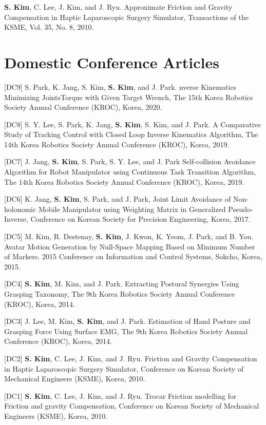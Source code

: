 \documentclass[margin,line]{res}
\begin{document}
\begin{resume}
    [DJ1] \textbf{S. Kim}, C. Lee, J. Kim, and J. Ryu.
  Approximate Friction and Gravity Compensation in Haptic Laparoscopic Surgery Simulator,
  Transactions of the KSME,
  Vol. 35, No. 8, 2010.

  \section{\sc Domestic Conference Articles}
   [DC9] S. Park, K. Jang, S. Kim, \textbf{S. Kim}, and J. Park.
  nverse Kinematics Minimizing JointsTorque with Given Target Wrench,
  The 15th Korea Robotics Society Annual Conference (KROC), Korea, 2020.


    [DC8] S. Y. Lee, S. Park, K. Jang, \textbf{S. Kim}, S. Kim, and J. Park.
  A Comparative Study of Tracking Control with Closed Loop Inverse Kinematics Algorithm,
  The 14th Korea Robotics Society Annual Conference (KROC), Korea, 2019.

    [DC7] J. Jang, \textbf{S. Kim}, S. Park, S. Y. Lee, and J. Park
  Self-collision Avoidance Algorithm for Robot Manipulator using Continuous Task Transition Algorithm,
  The 14th Korea Robotics Society Annual Conference (KROC), Korea, 2019.

    [DC6] K. Jang, \textbf{S. Kim}, S. Park, and J. Park,
  Joint Limit Avoidance of Non-holonomic Mobile Manipulator using Weighting Matrix in Generalized Pseudo-Inverse, Conference on Korean Society for Precision Engineering, Korea, 2017.

    [DC5] M. Kim, R. Destenay, \textbf{S. Kim}, J. Kwon, K. Yeom, {J. Park}, and B. You.
  Avatar Motion Generation by Null-Space Mapping Based on Minimum Number of Markers.
  2015 Conference on Information and Control Systems,
  Sokcho, Korea, 2015.

    [DC4] \textbf{S. Kim}, M. Kim, and J. Park.
  Extracting Postural Synergies Using Grasping Taxonomy,
  The 9th Korea Robotics Society Annual Conference (KROC), Korea, 2014.

    [DC3] J. Lee, M. Kim, \textbf{S. Kim}, and J. Park.
  Estimation of Hand Posture and Grasping Force Using Surface EMG,
  The 9th Korea Robotics Society Annual Conference (KROC), Korea, 2014.

    [DC2] \textbf{S. Kim}, C. Lee, J. Kim, and J. Ryu.
  Friction and Gravity Compensation in Haptic Laparoscopic Surgery Simulator,
  Conference on Korean Society of Mechanical Engineers (KSME), Korea, 2010.


    [DC1] \textbf{S. Kim}, C. Lee, J. Kim, and J. Ryu.
  Trocar Friction modelling for Friction and gravity Compensation,
  Conference on Korean Society of Mechanical Engineers (KSME), Korea, 2010.


\end{resume}
\end{document}
